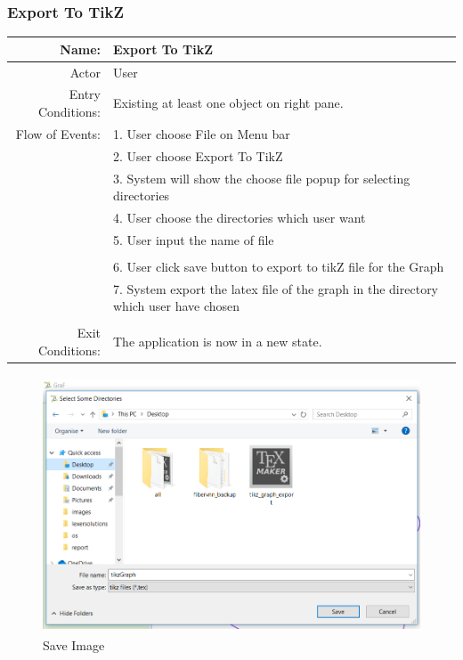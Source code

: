 \documentclass[a4paper,10pt]{article}
\begin{document}
\subsubsection{Export To TikZ}
	\begin{tabular}{|r|l|}
\hline
Name: & Export To TikZ \\
\hline
Actor & User \\
\hline
Entry Conditions: & Existing at least one object on right pane. \\
\hline
Flow of Events: & 1. User choose File on Menu bar \\
& 2. User choose Export To TikZ  \\
& 3. System will show the choose file popup for selecting directories \\
& 4. User choose the directories which user want\\
& 5. User input the name of file\\
\\
& 6. User click save button to export to tikZ file for the Graph\\
& 7. System export the latex file of the graph in the directory which user have chosen\\
\\
\hline
Exit Conditions: & The application is now in a new state. \\
\hline

\end{tabular}
\begin{figure}[H]
		\centering
		\includegraphics[height = 3in]{tikzFunc1.png}
		\caption[Optional caption]{Save Image}
		\label{fig:Repository}
	\end{figure}
\end{document}
